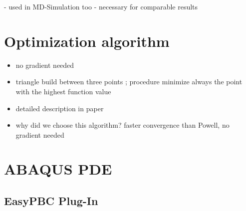     - used in MD-Simulation too
    - necessary for comparable results


    \section{Optimization algorithm}

    \begin{itemize}
    \item no gradient needed
    \item triangle build between three points ; procedure minimize always the point with the highest function value
    \item detailed description in paper
    \item why did we choose this algorithm? faster convergence than Powell, no gradient needed
    \end{itemize}   

    \section{ABAQUS PDE}
    \subsection{EasyPBC Plug-In}

